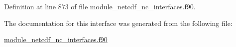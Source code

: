 Definition at line 873 of file module\+\_\+netcdf\+\_\+nc\+\_\+interfaces.\+f90.



The documentation for this interface was generated from the following file\+:\begin{DoxyCompactItemize}
\item 
\hyperlink{module__netcdf__nc__interfaces_8f90}{module\+\_\+netcdf\+\_\+nc\+\_\+interfaces.\+f90}\end{DoxyCompactItemize}
